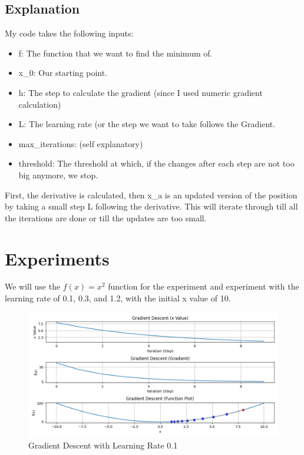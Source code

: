 \documentclass{article}
\begin{document}
\subsection{Explanation}
My code takes the following inputs:
\begin{itemize}
    \item f: The function that we want to find the minimum of.
    \item x\_0: Our starting point.
    \item h: The step to calculate the gradient (since I used numeric gradient calculation)
    \item L: The learning rate (or the step we want to take follows the Gradient.
    \item max\_iterations: (self explanatory)
    \item threshold: The threshold at which, if the changes after each step are not too big anymore, we stop.
\end{itemize}

\noindent First, the derivative is calculated, then x\_a is an updated version of the position by taking a small step L following the derivative. This will iterate through till all the iterations are done or till the updates are too small.

\section{Experiments}
We will use the $f(x) = x^2$ function for the experiment and experiment with the learning rate of 0.1, 0.3, and 1.2, with the initial x value of 10.

\begin{figure}[ht]
  \centering
  \includegraphics[width=1\textwidth]{images/lab1/gradient_descent_lr(0.1).png}
  \caption{Gradient Descent with Learning Rate 0.1}
  \label{fig:lr_0.1}
\end{figure}
\end{document}

